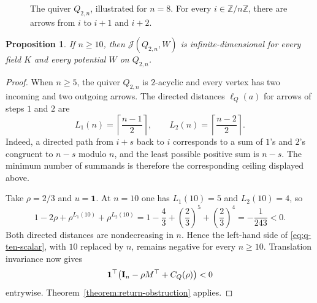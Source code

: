 \documentclass[11pt,letterpaper,reqno]{amsart}
\newtheorem{proposition}[proposition]{Proposition}
\theoremstyle{definition}
\newcommand{\one}{\mathbf 1}
\newcommand{\Jac}{\mathcal J}
\begin{document}
\begin{figure}[htbp]
	\centering
	\caption{The quiver $Q_{2,n}$, illustrated for $n=8$.  For every
		$i\in\mathbb Z/n\mathbb Z$, there are arrows from $i$ to $i+1$ and
		$i+2$.}
	\label{fig:q-n}
\end{figure}

\begin{proposition}
	\label{proposition:q-n}
	If $n\geq10$, then $\Jac(Q_{2,n},W)$ is infinite-dimensional for every field
	$K$ and every potential $W$ on $Q_{2,n}$.
\end{proposition}

\begin{proof}
	When $n\geq5$, the quiver $Q_{2,n}$ is $2$-acyclic and every vertex has
	two incoming and two outgoing arrows.  The directed distances
	$\ell_Q(a)$ for arrows of steps $1$ and $2$ are
	\[
	L_1(n)=\left\lceil\frac{n-1}{2}\right\rceil,
	\qquad
	L_2(n)=\left\lceil\frac{n-2}{2}\right\rceil.
	\]
	Indeed, a directed path from $i+s$ back to $i$ corresponds to a sum of
	$1$'s and $2$'s congruent to $n-s$ modulo $n$, and the least possible
	positive sum is $n-s$.  The minimum number of summands is therefore the
	corresponding ceiling displayed above.
	
	Take $\rho=2/3$ and $u=\one$.  At $n=10$ one has
	$L_1(10)=5$ and $L_2(10)=4$, so
	\begin{equation}
		\label{eq:q-ten-scalar}
		1-2\rho+\rho^{L_1(10)}+\rho^{L_2(10)}
		=
		1-\frac43+\left(\frac23\right)^5
		+\left(\frac23\right)^4
		=
		-\frac1{243}<0.
	\end{equation}
	Both directed distances are nondecreasing in $n$.  Hence the left-hand
	side of \eqref{eq:q-ten-scalar}, with $10$ replaced by $n$, remains
	negative for every $n\geq10$.  Translation invariance now gives
	\[
	\one^{\top}
	\bigl({\bf I}_{n}-\rho M^{\top}+C_Q(\rho)\bigr)<0
	\]
	entrywise.  Theorem~\ref{theorem:return-obstruction} applies.
\end{proof}
\end{document}
